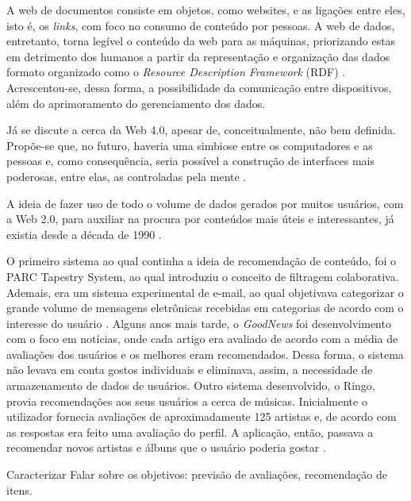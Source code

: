 A web de documentos consiste em objetos, como websites, e as ligações entre eles, isto é, os \textit{links}, com foco no consumo de conteúdo por pessoas. A web de dados, entretanto, torna legível o conteúdo da web para as máquinas, priorizando estas em detrimento dos humanos a partir da representação e organização das dados formato organizado como o \textit{Resource Description Framework} (RDF) \cite{Aghaei2012}. Acrescentou-se, dessa forma, a possibilidade da comunicação entre dispositivos, além do aprimoramento do gerenciamento dos dados.

Já se discute a cerca da Web 4.0, apesar de, conceitualmente, não bem definida. Propõe-se que, no futuro, haveria uma simbiose entre os computadores e as pessoas e, como consequência, seria possível a construção de interfaces mais poderosas, entre elas, as controladas pela mente \cite{Aghaei2012}.

A ideia de fazer uso de todo o volume de dados gerados por muitos usuários, com a Web 2.0, para auxiliar na procura por conteúdos mais úteis e interessantes, já existia desde a década de 1990 \cite{Jannach2010}.

O primeiro sistema ao qual continha a ideia de recomendação de conteúdo, foi o PARC Tapestry System, ao qual introduziu o conceito de filtragem colaborativa. Ademais, era um sistema experimental de e-mail, ao qual objetivava categorizar o grande volume de mensagens eletrônicas recebidas em categorias de acordo com o interesse do usuário \cite{Goldberg1992}.
Alguns anos mais tarde, o \textit{GoodNews} foi desenvolvimento com o foco em notícias, onde cada artigo era avaliado de acordo com a média de avaliações dos usuários e os melhores eram recomendados. Dessa forma, o sistema não levava em conta gostos individuais e eliminava, assim, a necessidade de armazenamento de dados de usuários.
Outro sistema desenvolvido, o Ringo, provia recomendações aos seus usuários a cerca de músicas. Inicialmente o utilizador fornecia avaliações  de aproximadamente 125 artistas e, de acordo com as respostas era feito uma avaliação do perfil.  A aplicação, então, passava a recomendar novos artistas e álbuns que o usuário poderia gostar \cite{Resnick1994}.


Caracterizar
Falar sobre os objetivos: previsão de avaliações, recomendação de itens.

